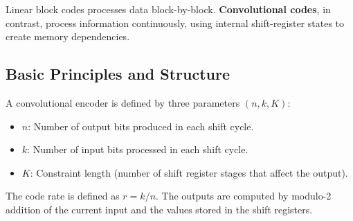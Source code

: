 \documentclass[12pt,a4paper]{article}
\begin{document}
Linear block codes processes data block-by-block. \textbf{Convolutional codes}, in contrast, process information continuously, using internal shift-register states to create memory dependencies.

\subsection{Basic Principles and Structure}
A convolutional encoder is defined by three parameters $(n, k, K)$:
\begin{itemize}[leftmargin=*, itemsep=2pt]
  \item $n$: Number of output bits produced in each shift cycle.
  \item $k$: Number of input bits processed in each shift cycle.
  \item $K$: Constraint length (number of shift register stages that affect the output).
\end{itemize}
The code rate is defined as $r = k/n$. The outputs are computed by modulo-2 addition of the current input and the values stored in the shift registers.
\end{document}
